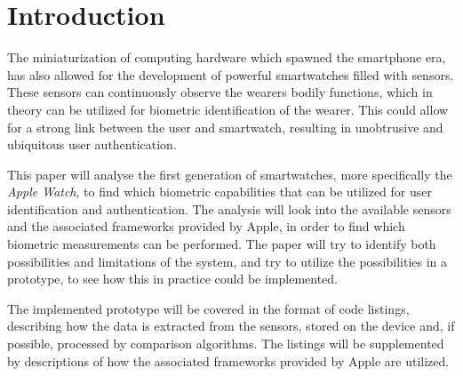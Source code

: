 \section{Introduction}
The miniaturization of computing hardware which spawned the smartphone era, has also
allowed for the development of powerful smartwatches filled with sensors.
These sensors can continuously observe the wearers bodily functions, which in 
theory can be utilized for biometric identification of the wearer.
This could allow for a strong link between the user and smartwatch, resulting in
unobtrusive and ubiquitous user authentication.

This paper will analyse the first generation of smartwatches, more specifically
the \textit{Apple Watch}, to find which biometric capabilities that can be
utilized for user identification and authentication. The analysis will look into
the available sensors and the associated frameworks provided by Apple, in order 
to find which biometric measurements can be performed. The paper will try to 
identify both possibilities and limitations of the system, and try to utilize 
the possibilities in a prototype, to see how this in practice could be 
implemented. 

The implemented prototype will be covered in the format of code listings, 
describing how the data is extracted from the sensors, stored on the device and,
if possible, processed by comparison algorithms. The listings will be
supplemented by descriptions of how the associated frameworks provided by 
Apple are utilized.
